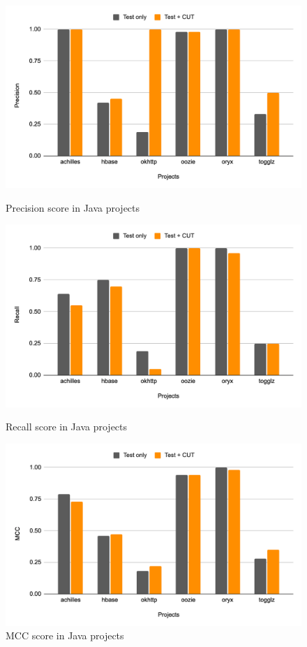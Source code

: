 \begin{figure}[!htbp]
  \centering
  \begin{minipage}[b]{0.4\textwidth}
    \includegraphics[width=\textwidth]{figures/replication/RQ3JavaPrecision.png}
    \caption{Precision score in Java projects}
    \label{fig:prec-java-cut}
  \end{minipage}
  \hfill
  \begin{minipage}[b]{0.4\textwidth}
    \includegraphics[width=\textwidth]{figures/replication/RQ3JavaRecall.png}
    \caption{Recall score in Java projects}
    \label{fig:recall-java-cut}
  \end{minipage}
  \hfill
  \begin{minipage}[b]{0.4\textwidth}
    \includegraphics[width=\textwidth]{figures/replication/RQ3JavaMCC.png}
    \caption{MCC score in Java projects}
    \label{fig:mcc-java-cut}
  \end{minipage}
\end{figure}
